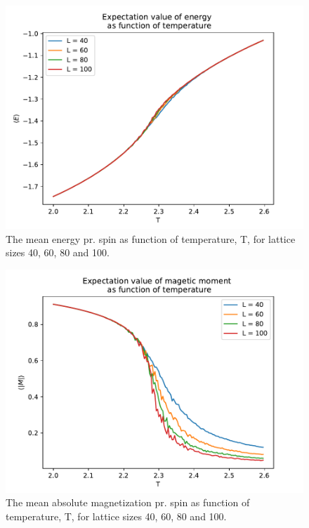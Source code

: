 \documentclass[12pt,english,a4paper]{article}
\newcommand*{\figuretitle}[1]{%
    {\centering%
    \textbf{#1}%
    \par}%
}
\begin{document}
\begin{figure}[H]
    \centering
    \includegraphics[scale=0.7]{Figures/E_of_T_mpi_2_2_6.pdf}
    \caption{The mean energy pr. spin as function of temperature, T, for lattice sizes 40, 60, 80 and 100.}
    \label{fig:E_of_T}
\end{figure}
\begin{figure}[H]
    \centering
    \includegraphics[scale=0.7]{Figures/M_of_T_mpi_2_2_6.pdf}
    \caption{The mean absolute magnetization pr. spin as function of temperature, T, for lattice sizes 40, 60, 80 and 100.}
    \label{fig:M_of_T}
\end{figure}
\end{document}
